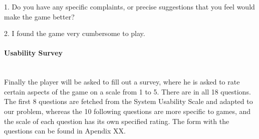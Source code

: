 1. Do you have any specific complaints, or precise suggestions that you feel would make the game better?

2. I found the game very cumbersome to play.

\paragraph{Usability Survey}\mbox{}\\

Finally the player will be asked to fill out a survey, where he is asked to rate certain aspects of the game on a scale from 1 to 5. There are in all 18 questions. The first 8 questions are fetched from the System Usability Scale and adapted to our problem, whereas the 10 following questions are more specific to games, and the scale of each question has its own specified rating. The form with the questions can be found in Apendix XX.

